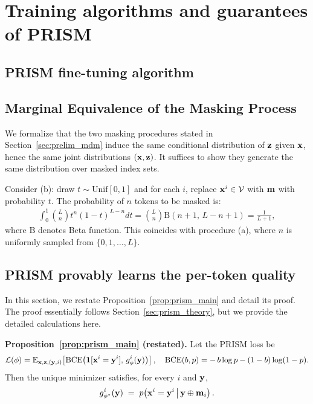 \section{Training algorithms and guarantees of PRISM}

\subsection{PRISM fine-tuning algorithm}
\label{app:prism-algorithm}

\subsection{Marginal Equivalence of the Masking Process}
\label{appendix: marginal equality}
We formalize that the two masking procedures stated in Section~\ref{sec:prelim_mdm} induce the same conditional distribution of ${\mathbf{z}}$ given ${\mathbf{x}}$, hence the same joint distributions $({\mathbf{x}},{\mathbf{z}})$. It suffices to show they generate the same distribution over masked index sets.

Consider (b): draw $t\sim\mathrm{Unif}[0,1]$ and for each $i$, replace ${\mathbf{x}}^i \in\mathcal{V}$ with $\mathbf{m}$ with probability $t$. The probability of $n$ tokens to be masked is:
\begin{align*}
\int_{0}^{1} \binom{L}{n} t^{n} (1-t)^{L-n}dt = \binom{L}{n} \mathrm{B}(n+1,\, L-n+1)= 
\frac{1}{L+1},
\end{align*}
where $\mathrm{B}$ denotes Beta function. This coincides with procedure (a), where $n$ is uniformly sampled from  $\{0,1,\dots,L\}$.

\subsection{PRISM provably learns the per-token quality}
\label{proposition_proof}
In this section, we restate Proposition~\ref{prop:prism_main} and detail its proof. The proof essentially follows Section~\ref{sec:prism_theory}, but we provide the detailed calculations here.

\noindent\textbf{Proposition~\ref{prop:prism_main} (restated).}
Let the PRISM loss be
\[
\mathcal{L}(\phi)=\mathbb{E}_{{\mathbf{x}},{\mathbf{z}},({\mathbf{y}},i)}\!\left[\mathrm{BCE}\big(\mathbf{1}[{\mathbf{x}}^i={\mathbf{y}}^i],\, g_\phi^i({\mathbf{y}})\big)\right],
\quad
\mathrm{BCE}(b,p)=-\,b\log p-(1-b)\log(1-p).
\]
Then the unique minimizer satisfies, for every $i$ and ${\mathbf{y}}$,
\[
g_{\phi^\star}^i({\mathbf{y}})\;=\;p\!\left({\mathbf{x}}^i={\mathbf{y}}^i\,\middle|\,{\mathbf{y}}\oplus\mathbf{m}_i\right).
\]

